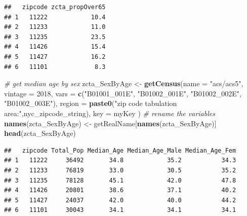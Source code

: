 \documentclass[openany]{book}
\newenvironment{Shaded}{\begin{snugshade}}{\end{snugshade}}
\newcommand{\CommentTok}[1]{\textcolor[rgb]{0.56,0.35,0.01}{\textit{#1}}}
\newcommand{\DataTypeTok}[1]{\textcolor[rgb]{0.13,0.29,0.53}{#1}}
\newcommand{\DecValTok}[1]{\textcolor[rgb]{0.00,0.00,0.81}{#1}}
\newcommand{\KeywordTok}[1]{\textcolor[rgb]{0.13,0.29,0.53}{\textbf{#1}}}
\newcommand{\NormalTok}[1]{#1}
\newcommand{\StringTok}[1]{\textcolor[rgb]{0.31,0.60,0.02}{#1}}
\begin{document}
\begin{verbatim}
##   zipcode zcta_propOver65
## 1   11222            10.4
## 2   11233            11.0
## 3   11235            23.5
## 4   11426            15.4
## 5   11427            16.2
## 6   11101             8.3
\end{verbatim}

\begin{Shaded}
\begin{Highlighting}[]
\CommentTok{# get median age by sex}
\NormalTok{zcta_SexByAge <-}\StringTok{ }\KeywordTok{getCensus}\NormalTok{(}\DataTypeTok{name =} \StringTok{"acs/acs5"}\NormalTok{,}
                                 \DataTypeTok{vintage =} \DecValTok{2018}\NormalTok{,}
                                 \DataTypeTok{vars =} \KeywordTok{c}\NormalTok{(}\StringTok{"B01001_001E"}\NormalTok{, }\StringTok{"B01002_001E"}\NormalTok{, }
                                          \StringTok{"B01002_002E"}\NormalTok{, }\StringTok{"B01002_003E"}\NormalTok{),}
                                 \DataTypeTok{region =} \KeywordTok{paste0}\NormalTok{(}\StringTok{"zip code tabulation area:"}\NormalTok{,nyc_zipcode_string),}
                                 \DataTypeTok{key =}\NormalTok{ myKey}
\NormalTok{)}
\CommentTok{# rename the variables}
\KeywordTok{names}\NormalTok{(zcta_SexByAge) <-}\StringTok{ }\NormalTok{getRealName[}\KeywordTok{names}\NormalTok{(zcta_SexByAge)]}
\KeywordTok{head}\NormalTok{(zcta_SexByAge)}
\end{Highlighting}
\end{Shaded}

\begin{verbatim}
##   zipcode Total_Pop Median_Age Median_Age_Male Median_Age_Fem
## 1   11222     36492       34.8            35.2           34.3
## 2   11233     76819       33.0            30.5           35.2
## 3   11235     78128       45.1            42.0           47.8
## 4   11426     20801       38.6            37.1           40.2
## 5   11427     24037       42.0            40.0           44.2
## 6   11101     30043       34.1            34.1           34.1
\end{verbatim}
\end{document}
